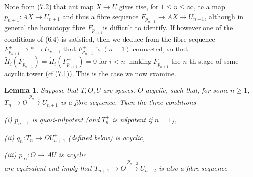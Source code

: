 \documentclass[openany,leqno]{book}  %
\newtheorem{lemma}[theorem]{Lemma}
\begin{document}
Note from (7.2) that ant map $X\longrightarrow U$ gives rise, for $1\leqslant n \leqslant \infty$, to a map $p_{n+1}\colon  AX\longrightarrow U_{n+1}$ and thus a fibre sequence $F_{p_{n+1}}\longrightarrow AX \longrightarrow U_{n+1}$, although in general the homotopy fibre $F_{p_{n+1}}$is difficult to identify. If however one of the conditions of (6.4) is satisfied, then we deduce from the fibre sequence $F_{p_{n+1}}^+\longrightarrow * \longrightarrow U_{n+1}^+$ that $F_{p_{n+1}}^+$ is $(n-1)$-connected, so that $\widetilde{H}_i(F_{p_{n+1}})=\widetilde{H}_i(F_{p_{n+1}}^+)=0$ for $i< n$, making $F_{p_{n+1}}$ the $n$-th stage of some acyclic tower (cf.(7.1)). This is the case we now examine.
\begin{lemma}
  Suppose that $T,O,U$ are spaces, $O$ acyclic, such that, for some $n\geqslant 1$, $T_n\longrightarrow O {\overset{p_{n+1}}\longrightarrow} U_{n+1}$ is a fibre sequence. Then the three conditions
  
  (i) $p_{n+1}$ is quasi-nilpotent (and $T_n^+$ is nilpotent if $n=1$),
  
  (ii) $q_n\colon  T_n \longrightarrow \Omega U_{n+1}^+$ (defined below) is acyclic,
  
  (iii) $p_{\infty}\colon   O \longrightarrow AU$ is acyclic \\
are equivalent and imply that $T_{n+1} \longrightarrow O {\overset{p_{n+2}}\longrightarrow} U_{n+2}$ is also a fibre sequence.
\end{lemma}
\end{document}
